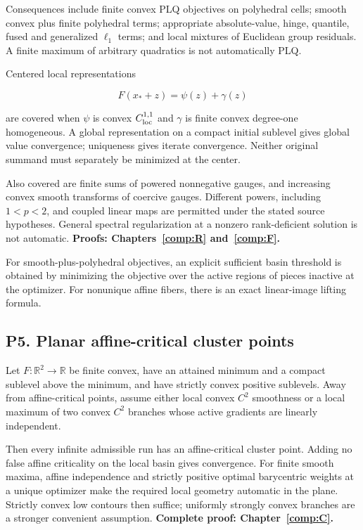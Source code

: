 Consequences include finite convex PLQ objectives on polyhedral cells; smooth convex plus finite polyhedral terms; appropriate absolute-value, hinge, quantile, fused and generalized \(\ell_1\) terms; and local mixtures of Euclidean group residuals. A finite maximum of arbitrary quadratics is not automatically PLQ.

Centered local representations

\[F(x_*+z)=\psi(z)+\gamma(z)\]

are covered when \(\psi\) is convex \(C^{1,1}_{\rm loc}\) and \(\gamma\) is finite convex degree-one homogeneous. A global representation on a compact initial sublevel gives global value convergence; uniqueness gives iterate convergence. Neither original summand must separately be minimized at the center.

Also covered are finite sums of powered nonnegative gauges, and increasing convex smooth transforms of coercive gauges. Different powers, including \(1<p<2\), and coupled linear maps are permitted under the stated source hypotheses. General spectral regularization at a nonzero rank-deficient solution is not automatic. \textbf{Proofs: Chapters~\ref{comp:R} and~\ref{comp:F}.}

For smooth-plus-polyhedral objectives, an explicit sufficient basin threshold is obtained by minimizing the objective over the active regions of pieces inactive at the optimizer. For nonunique affine fibers, there is an exact linear-image lifting formula.



\subsection{P5. Planar affine-critical cluster points}\label{p5.-planar-affine-critical-cluster-points}

Let \(F:\mathbb R^2\to\mathbb R\) be finite convex, have an attained minimum and a compact sublevel above the minimum, and have strictly convex positive sublevels. Away from affine-critical points, assume either local convex \(C^2\) smoothness or a local maximum of two convex \(C^2\) branches whose active gradients are linearly independent.

Then every infinite admissible run has an affine-critical cluster point. Adding no false affine criticality on the local basin gives convergence. For finite smooth maxima, affine independence and strictly positive optimal barycentric weights at a unique optimizer make the required local geometry automatic in the plane. Strictly convex low contours then suffice; uniformly strongly convex branches are a stronger convenient assumption. \textbf{Complete proof: Chapter~\ref{comp:C}.}

